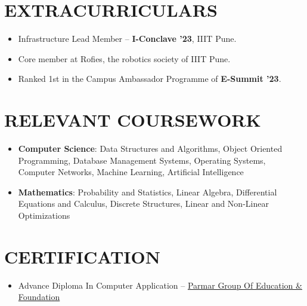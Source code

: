 \documentclass[letterpaper,9pt]{article}
\newcommand{\secgap}{\vspace{4pt}}
\newcommand{\headgap}{\vspace{2pt}}
\newcommand{\bulletgap}{\vspace{1pt}}
\begin{document}
\secgap
\section{EXTRACURRICULARS}
\headgap
\begin{itemize}
    \item \footnotesize Infrastructure Lead Member -- \textbf{I-Conclave '23}, IIIT Pune.
    \bulletgap
    \item \footnotesize Core member at Rofies, the robotics society of IIIT Pune.
    \bulletgap
    \item \footnotesize Ranked 1st in the Campus Ambassador Programme of \textbf{E-Summit '23}.
\end{itemize}

\secgap
\section{RELEVANT COURSEWORK}
\headgap
\begin{itemize}
    \item \textbf{\small Computer Science}: \footnotesize Data Structures and Algorithms, Object Oriented Programming, Database Management Systems, Operating Systems, Computer Networks, Machine Learning, Artificial Intelligence
    \bulletgap
    \item \textbf{\small Mathematics}: \footnotesize Probability and Statistics, Linear Algebra, Differential Equations and Calculus, Discrete Structures, Linear and Non-Linear Optimizations
\end{itemize}

\secgap
\section{CERTIFICATION}
\headgap
\begin{itemize}
    \item \footnotesize Advance Diploma In Computer Application -- \href{https://drive.google.com/file/d/1oBOJF2IvcmbFogXRdlGLUJNIZz21jZJw/view?usp=sharing}{\textcolor{linkcolor}{Parmar Group Of Education \& Foundation}}
\end{itemize}
\end{document}
